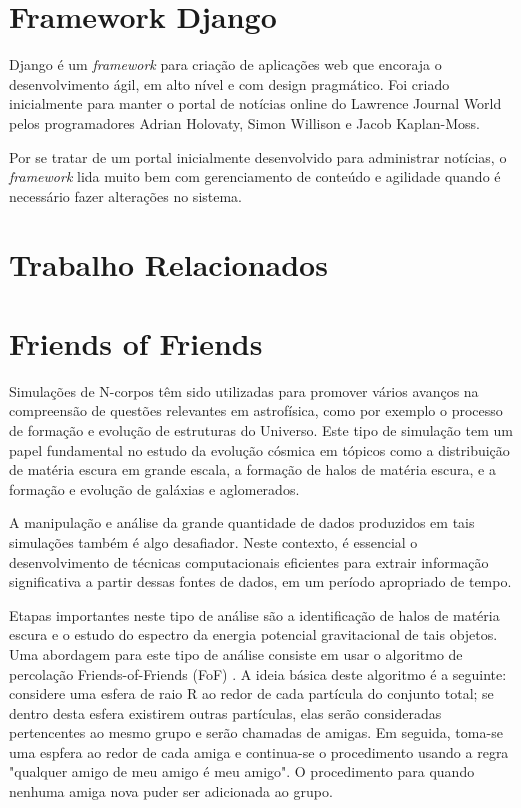 \documentclass[tg]{mdtufsm}
\begin{document}
\section{Framework Django}
Django\cite{django} é um \emph{framework} para criação de aplicações web que encoraja o desenvolvimento ágil, em alto nível e com design pragmático. Foi criado inicialmente para manter o portal de notícias online do Lawrence Journal World pelos programadores Adrian Holovaty, Simon Willison e Jacob Kaplan-Moss.

Por se tratar de um portal inicialmente desenvolvido para administrar notícias, o \emph{framework} lida muito  bem com gerenciamento de conteúdo e agilidade quando é necessário fazer alterações no sistema.

\section{Trabalho Relacionados}



\section{Friends of Friends}
Simulações de N-corpos têm sido utilizadas para promover vários avanços na compreensão de questões relevantes em astrofísica, como por exemplo o processo de formação e evolução de estruturas do Universo. Este tipo de simulação tem um papel fundamental\cite{Bertschinger,Efstathiou} no estudo da evolução cósmica em tópicos como a distribuição de matéria escura em grande escala, a formação de halos de matéria escura, e a formação e evolução de galáxias e aglomerados.

A manipulação e análise da grande quantidade de dados produzidos em tais simulações também é algo desafiador.
Neste contexto, é essencial o desenvolvimento de técnicas computacionais eficientes para extrair informação
significativa a partir dessas fontes de dados, em um período apropriado de tempo.

Etapas importantes neste tipo de análise são a identificação de halos de matéria escura e o estudo do espectro da
energia potencial gravitacional de tais objetos. Uma abordagem para este tipo de análise consiste em usar o
algoritmo de percolação Friends-of-Friends (FoF) \cite{uchra} . A ideia básica deste algoritmo é a seguinte: considere uma
esfera de raio R ao redor de cada partícula do conjunto total; se dentro desta esfera existirem outras partículas, elas
serão consideradas pertencentes ao mesmo grupo e serão chamadas de amigas. Em seguida, toma-se uma espfera ao
redor de cada amiga e continua-se o procedimento usando a regra "qualquer amigo de meu amigo é meu amigo". O
procedimento para quando nenhuma amiga nova puder ser adicionada ao grupo.
\end{document}
